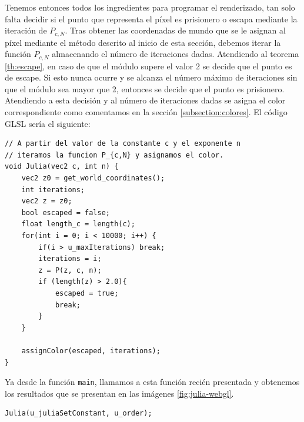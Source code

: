 Tenemos entonces todos los ingredientes para programar el renderizado, tan solo falta decidir si el punto que representa el píxel es prisionero o escapa mediante la iteración de $P_{c,N}$. Tras obtener las coordenadas de mundo que se le asignan al píxel mediante el método descrito al inicio de esta sección, debemos iterar la función $P_{c,N}$ almacenando el número de iteraciones dadas. Atendiendo al teorema \ref{th:escape}, en caso de que el módulo supere el valor 2 se decide que el punto es de escape. Si esto nunca ocurre y se alcanza el número máximo de iteraciones sin que el módulo sea mayor que 2, entonces se decide que el punto es prisionero. Atendiendo a esta decisión y al número de iteraciones dadas se asigna el color correspondiente como comentamos en la sección \ref{subsection:colores}. El código GLSL sería el siguiente:

\begin{lstlisting}
// A partir del valor de la constante c y el exponente n
// iteramos la funcion P_{c,N} y asignamos el color.
void Julia(vec2 c, int n) {
    vec2 z0 = get_world_coordinates();
    int iterations;
    vec2 z = z0;
    bool escaped = false;
    float length_c = length(c);
    for(int i = 0; i < 10000; i++) {
        if(i > u_maxIterations) break;
        iterations = i;
        z = P(z, c, n);
        if (length(z) > 2.0){
            escaped = true;
            break;
        }
    }

    assignColor(escaped, iterations);
}
\end{lstlisting}

Ya desde la función \verb|main|, llamamos a esta función recién presentada y obtenemos los resultados que se presentan en las imágenes \ref{fig:julia-webgl}.  

\begin{lstlisting}
Julia(u_juliaSetConstant, u_order);
\end{lstlisting}

